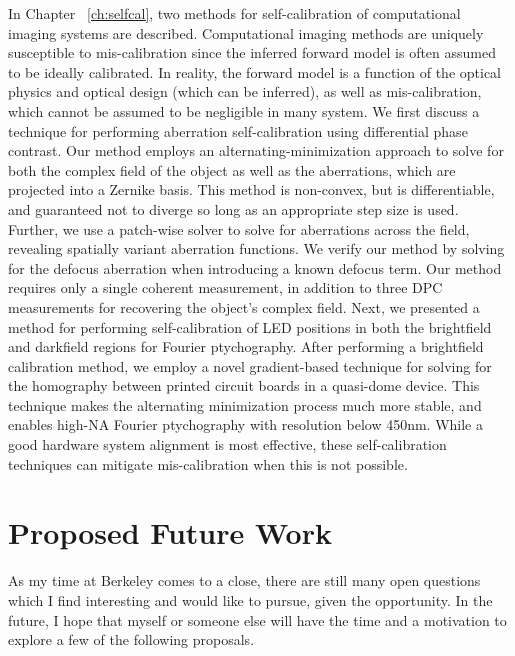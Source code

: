 In Chapter ~\ref{ch:selfcal}, two methods for self-calibration of computational imaging systems are described. Computational imaging methods are uniquely susceptible to mis-calibration since the inferred forward model is often assumed to be ideally calibrated. In reality, the forward model is a function of the optical physics and optical design (which can be inferred), as well as mis-calibration, which cannot be assumed to be negligible in many system. We first discuss a technique for performing aberration self-calibration using differential phase contrast. Our method employs an alternating-minimization approach to solve for both the complex field of the object as well as the aberrations, which are projected into a Zernike basis. This method is non-convex, but is differentiable, and guaranteed not to diverge so long as an appropriate step size is used. Further, we use a patch-wise solver to solve for aberrations across the field, revealing spatially variant aberration functions. We verify our method by solving for the defocus aberration when introducing a known defocus term. Our method requires only a single coherent measurement, in addition to three DPC measurements for recovering the object's complex field. Next, we presented a method for performing self-calibration of LED positions in both the brightfield and darkfield regions for Fourier ptychography. After performing a brightfield calibration method, we employ a novel gradient-based technique for solving for the homography between printed circuit boards in a quasi-dome device. This technique makes the alternating minimization process much more stable, and enables high-NA Fourier ptychography with resolution below 450nm. While a good hardware system alignment is most effective, these self-calibration techniques can mitigate mis-calibration when this is not possible.

\section{Proposed Future Work}
As my time at Berkeley comes to a close, there are still many open questions which I find interesting and would like to pursue, given the opportunity. In the future, I hope that myself or someone else will have the time and a motivation to explore a few of the following proposals.

